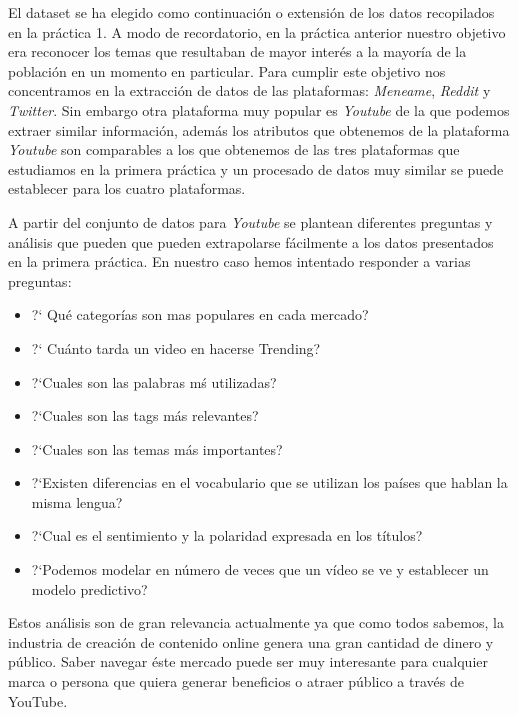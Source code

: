\documentclass[a4paper,12pt]{article}
\begin{document}
El dataset se ha elegido como continuaci\'on o extensi\'on de los datos recopilados en la pr\'actica 1. A modo de recordatorio, en la pr\'actica anterior nuestro objetivo era reconocer los temas que resultaban de mayor inter\'es a la mayor\'ia de la poblaci\'on en un momento en particular. Para cumplir este objetivo nos concentramos en la extracci\'on de datos de las plataformas:  {\itshape Meneame}, {\itshape Reddit} y {\itshape Twitter}. Sin embargo otra plataforma muy popular es {\itshape Youtube} de la que podemos extraer similar informaci\'on, adem\'as los atributos que obtenemos de la plataforma {\itshape Youtube} son comparables a los que obtenemos de las tres plataformas que estudiamos en la primera pr\'actica y un procesado de datos muy similar se puede establecer para los cuatro plataformas.

A partir del conjunto de datos para  {\itshape Youtube}  se plantean diferentes preguntas y an\'alisis que pueden que pueden extrapolarse f\'acilmente a los datos presentados en la primera pr\'actica. En nuestro caso hemos intentado responder a varias preguntas:

\begin{itemize}

\item  ?` Qu\'e categor\'ias son mas populares en cada mercado?
\item ?` Cu\'anto tarda un video en hacerse Trending?
\item ?`Cuales son las palabras m\'s utilizadas?
\item ?`Cuales son las tags m\'as relevantes?
\item ?`Cuales son las temas m\'as importantes?
\item ?`Existen diferencias en el vocabulario que se utilizan los pa\'ises que hablan la misma lengua?
\item ?`Cual es el sentimiento y la polaridad expresada en los t\'itulos?
\item ?`Podemos modelar en n\'umero de veces que un v\'ideo se ve y establecer un modelo predictivo?

\end{itemize}

Estos an\'alisis son de gran relevancia actualmente ya que como todos sabemos, la industria de creaci\'on de contenido online genera una gran cantidad de dinero y p\'ublico. Saber navegar \'este mercado puede ser muy interesante para cualquier marca o persona que quiera generar beneficios o atraer p\'ublico a trav\'es de YouTube.
\end{document}
